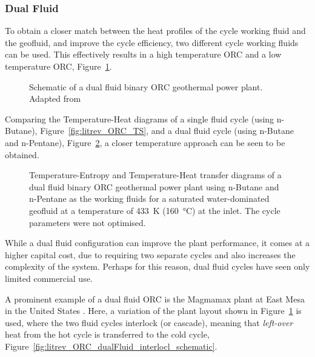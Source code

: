         \subsubsection{Dual Fluid}
            To obtain a closer match between the heat profiles of the cycle working fluid and the geofluid, and improve the cycle efficiency, two different cycle working fluids can be used. This effectively results in a high temperature \ac{ORC} and a low temperature \ac{ORC}, Figure~\ref{fig:litrev_ORC_dualFluid_schematic}.
        
             \begin{figure}[H]
                \centering
                
                \caption[Schematic of a dual fluid binary ORC geothermal power plant.]{Schematic of a dual fluid binary ORC geothermal power plant. Adapted from \cite{DiPippo2016}}
                \label{fig:litrev_ORC_dualFluid_schematic}
            \end{figure}

            Comparing the Temperature-Heat diagrams of a single fluid cycle (using n-Butane), Figure~\ref{fig:litrev_ORC_TS}, and a dual fluid cycle (using n-Butane and n-Pentane), Figure~\ref{fig:litrev_ORC_dualFluid_TS}, a closer temperature approach can be seen to be obtained.
                
             \begin{figure}[H]
                \centering
                
                \caption[TS and TQ diagrams of a dual fluid binary \ac{ORC} geothermal power plant using n-Butane and n-Pentane as the working fluids.]{Temperature-Entropy and Temperature-Heat transfer diagrams of a dual fluid binary ORC geothermal power plant using n-Butane and n-Pentane as the working fluids for a saturated water-dominated geofluid at a temperature of \qty{433}{\K} (\qty{160}{\degreeCelsius}) at the inlet. The cycle parameters were not optimised.}
                \label{fig:litrev_ORC_dualFluid_TS}
            \end{figure}
    
            While a dual fluid configuration can improve the plant performance, it comes at a higher capital cost, due to requiring two separate cycles and also increases the complexity of the system. Perhaps for this reason, dual fluid cycles have seen only limited commercial use.
            
            A prominent example of a dual fluid \ac{ORC} is the Magmamax plant at East Mesa in the United States \cite{DiPippo2016}. Here, a variation of the plant layout shown in Figure~\ref{fig:litrev_ORC_dualFluid_schematic} is used, where the two fluid cycles interlock (or cascade), meaning that \emph{left-over} heat from the hot cycle is transferred to the cold cycle, Figure~\ref{fig:litrev_ORC_dualFluid_interlocl_schematic}.


